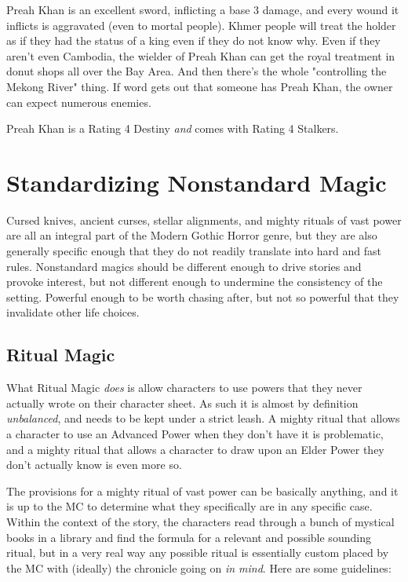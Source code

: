 Preah Khan is an excellent sword, inflicting a base 3 damage, and every wound it inflicts is aggravated (even to mortal people). Khmer people will treat the holder as if they had the status of a king even if they do not know why. Even if they aren't even Cambodia, the wielder of Preah Khan can get the royal treatment in donut shops all over the Bay Area. And then there's the whole "controlling the Mekong River" thing. If word gets out that someone has Preah Khan, the owner can expect numerous enemies.

Preah Khan is a Rating 4 Destiny \textit{and} comes with Rating 4 Stalkers.

\section{Standardizing Nonstandard Magic}

Cursed knives, ancient curses, stellar alignments, and mighty rituals of vast power are all an integral part of the Modern Gothic Horror genre, but they are also generally specific enough that they do not readily translate into hard and fast rules. Nonstandard magics should be different enough to drive stories and provoke interest, but not different enough to undermine the consistency of the setting. Powerful enough to be worth chasing after, but not so powerful that they invalidate other life choices.

\subsection{Ritual Magic}

What Ritual Magic \textit{does} is allow characters to use powers that they never actually wrote on their character sheet. As such it is almost by definition \textit{unbalanced}, and needs to be kept under a strict leash. A mighty ritual that allows a character to use an Advanced Power when they don't have it is problematic, and a mighty ritual that allows a character to draw upon an Elder Power they don't actually know is even more so.

The provisions for a mighty ritual of vast power can be basically anything, and it is up to the MC to determine what they specifically are in any specific case. Within the context of the story, the characters read through a bunch of mystical books in a library and find the formula for a relevant and possible sounding ritual, but in a very real way any possible ritual is essentially custom placed by the MC with (ideally) the chronicle going on \textit{in mind}. Here are some guidelines:


